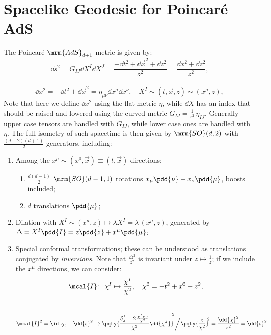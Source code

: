 \documentclass[a4paper,10pt]{article}
\begin{document}
\section{Spacelike Geodesic for Poincar\'e AdS}
	The Poincar\'e $\mrm{AdS}_{d+1}$ metric is given by:
	\begin{equation}
		\dd{s}^2
		= G_{IJ} \dd{X^I} \dd{X^J}
		= \frac{
				-\dd{t}^2 + \dd{\vec{x}}^2 + \dd{z}^2
			}{z^2}
		= \frac{
				\dd{x}^2 + \dd{z}^2
			}{z^2},
	\end{equation}
	\\[-1.8\baselineskip]
	\begin{equation}
		\dd{x}^2
		= -\dd{t}^2 + \dd{\vec{x}}^2
		= \eta_{\mu\nu} \dd{x}^\mu \dd{x}^\nu,
	\quad
		X^I \sim (t,\vec{x},z)
		\sim (x^\mu, z),
	\end{equation}
	Note that here we define $\dd{x}^2$ using the flat metric $\eta$, while $\dd{X}$ has an index that should be raised and lowered using the curved metric $G_{IJ} = \frac{1}{z^2}\,\eta_{IJ}$. Generally upper case tensors are handled with $G_{IJ}$, while lower case ones are handled with $\eta$. 
	The full isometry of such spacetime is then given by $\mrm{SO}(d,2)$ with $\frac{(d+2)(d+1)}{2}$ generators, including:
	\begin{enumerate}[itemsep=.2\baselineskip]
	\item Among the $x^\mu \sim (x^0,\vec{x}) \equiv (t,\vec{x})$ directions:
		\begin{enumerate}[noitemsep]
		\item $\frac{d(d-1)}{2}$ $\mrm{SO}(d-1,1)$ rotations $
			x_\mu \pdd{\nu} - x_\nu \pdd{\mu}
		$, boosts included;
		\item $d$ translations $\pdd{\mu}$;
		\end{enumerate}
	\item Dilation with $X^I \sim (x^\mu,z)\mapsto \lambda X^I = \lambda\,(x^\mu,z)$, generated by $\Delta = X^I \pdd{I} = z\pdd{z} + x^\mu \pdd{\mu}$;
	\item Special conformal transformations; these can be understood as translations conjugated by \textit{inversions}. Note that $\frac{\dd{z}^2}{z^2}$ is invariant under $z\mapsto \frac{1}{z}$; if we include the $x^\mu$ directions, we can consider:
	\begin{equation}
		\mcal{I}\colon\ \chi^I \mapsto
			\frac{\chi^I}{\chi^2},
	\quad
		\chi^2 = -t^2 + \vec{x}^2 + z^2,
	\end{equation}
	\\[-1.5\baselineskip]
	\begin{equation}
		\mcal{I}^2 = \idty,
	\quad
		\dd{s}^2
		\mapsto \pqty{
				\frac{
					\delta^I_J
					- 2\,\frac{\chi^I \chi_J}{\chi^2}
				}{\chi^2}
				\dd{\chi^J}
			}^{\!\!2}
			\bigg/ \pqty{
				\frac{z}{\chi^2}
			}^{\!\!2}
		= \frac{\dd{\chi}^2}{z^2}
		= \dd{s}^2
	\end{equation}
	\end{enumerate}
\end{document}
